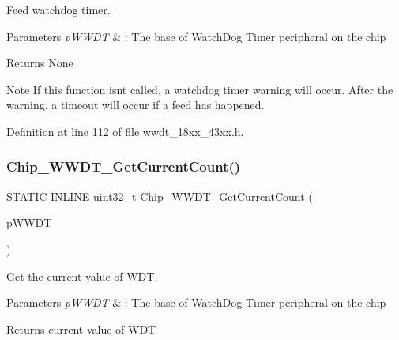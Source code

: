Feed watchdog timer. 


\begin{DoxyParams}{Parameters}
{\em p\+W\+W\+DT} & \+: The base of Watch\+Dog Timer peripheral on the chip \\
\hline
\end{DoxyParams}
\begin{DoxyReturn}{Returns}
None 
\end{DoxyReturn}
\begin{DoxyNote}{Note}
If this function isn\textquotesingle{}t called, a watchdog timer warning will occur. After the warning, a timeout will occur if a feed has happened. 
\end{DoxyNote}


Definition at line 112 of file wwdt\+\_\+18xx\+\_\+43xx.\+h.

\mbox{\label{group___w_w_d_t__18_x_x__43_x_x_ga4b1c8d2f48a8397d63c1c3c74dc7e82a}} 
\subsubsection{\texorpdfstring{Chip\+\_\+\+W\+W\+D\+T\+\_\+\+Get\+Current\+Count()}{Chip\_WWDT\_GetCurrentCount()}}
{\footnotesize\ttfamily \hyperlink{group___l_p_c___types___public___macros_ga10b2d890d871e1489bb02b7e70d9bdfb}{S\+T\+A\+T\+IC} \hyperlink{spifi__18xx__43xx_8h_a2eb6f9e0395b47b8d5e3eeae4fe0c116}{I\+N\+L\+I\+NE} uint32\+\_\+t Chip\+\_\+\+W\+W\+D\+T\+\_\+\+Get\+Current\+Count (\begin{DoxyParamCaption}\item[{\hyperlink{struct_l_p_c___w_w_d_t___t}{L\+P\+C\+\_\+\+W\+W\+D\+T\+\_\+T} $\ast$}]{p\+W\+W\+DT }\end{DoxyParamCaption})}



Get the current value of W\+DT. 


\begin{DoxyParams}{Parameters}
{\em p\+W\+W\+DT} & \+: The base of Watch\+Dog Timer peripheral on the chip \\
\hline
\end{DoxyParams}
\begin{DoxyReturn}{Returns}
current value of W\+DT 
\end{DoxyReturn}


